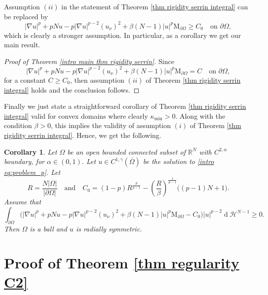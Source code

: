 \documentclass[10pt,a4paper]{amsart}
\numberwithin{equation}{section}
\newcommand{\R}{\mathbb{R}}
\newtheorem{cor}[teo]{Corollary}
\renewcommand{\d}[1]{\ensuremath{\operatorname{d}\!{#1}}}
\begin{document}
Assumption $(ii)$ in the statement of Theorem \ref{thm rigidity serrin integral} can be replaced by
\begin{equation*}
    |\nabla u|^p + pNu - p |\nabla u|^{p-2} (u_\nu)^2 + \beta(N-1) |u|^p \mathrm{M}_{\partial\Omega}  \geq C_0 \quad \text{on } \partial\Omega,
\end{equation*}
which is clearly a stronger assumption. In particular, as a corollary we get our main result.

\begin{proof}[Proof of Theorem \ref{intro main thm rigidity serrin}]
    Since 
    \[
    |\nabla u|^p + pNu - p |\nabla u|^{p-2} (u_\nu)^2 + \beta(N-1) |u|^p \mathrm{M}_{\partial\Omega} = C\quad \text{on } \partial\Omega,
    \]
    for a constant $C \geq C_0$, then assumption $(ii)$ of Theorem \ref{thm rigidity serrin integral} holds and the conclusion follows.
\end{proof}

Finally we just state a straightforward corollary of Theorem \ref{thm rigidity serrin integral} valid for convex domains where clearly $\kappa_{\min} > 0$. Along with the condition $\beta>0$, this implies the validity of assumption $(i)$ of Theorem \ref{thm rigidity serrin integral}. Hence, we get the following.

\begin{cor}\label{cor rigidity serrin integral}
     Let $\Omega$ be an open bounded connected subset of $\R^N$ with $C^{2,\alpha}$ boundary, for $\alpha \in (0,1)$. Let $u \in C^{1,\gamma}(\overline{\Omega})$ be the solution to \eqref{intro eq:problem_p}. Let 
    \begin{equation*}
        R = \frac{N|\Omega|}{|\partial\Omega|} \quad \text{and} \quad  C_0 = (1-p)R^{\frac{p}{p-1}} - \left( \frac{R}{\beta} \right)^{\frac{1}{p-1}} \big( (p-1)N + 1 \big). 
    \end{equation*}
    Assume that 
    \[
    \displaystyle \int_{\partial\Omega} \Big( |\nabla u|^p + pNu - p |\nabla u|^{p-2} (u_\nu)^2 + \beta(N-1) |u|^p \mathrm{M}_{\partial\Omega}  - C_0 \Big) |u|^{p-2} \d{}\mathcal{H}^{N-1} \geq 0.
    \]
    Then $\Omega$ is a ball and $u$ is radially symmetric.
\end{cor}

\appendix
\section{Proof of Theorem \ref{thm regularity C2}}\label{sec: appendix reg}
\end{document}
